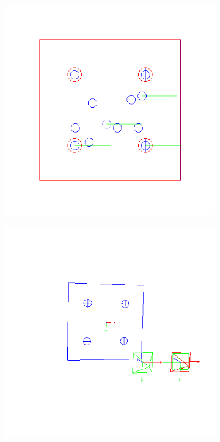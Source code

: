 \begin{figure}[ht!]
\centering
  \centering
  \begin{subfigure}{.48\linewidth}
    \centering
    \includegraphics[width=\linewidth]{figures/plots/ex1pimage.png}
    \caption{}
    \label{fig:ex1cimage}
  \end{subfigure}
  \begin{subfigure}{.48\linewidth}
    \centering
    \includegraphics[width=\linewidth]{figures/plots/ex1pscene.png}

\end{subfigure}
\end{figure}
